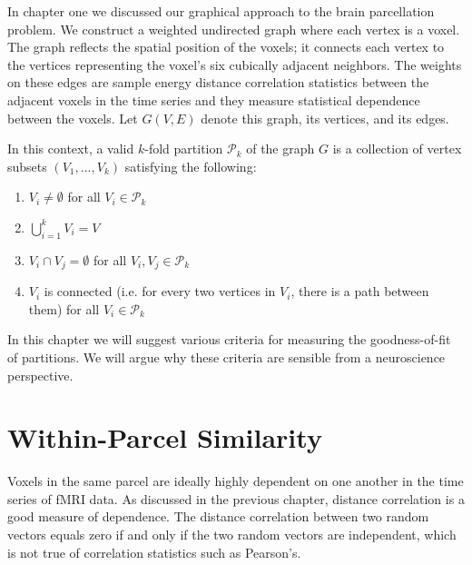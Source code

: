 
In chapter one we discussed our graphical approach to the brain
parcellation problem. We construct a weighted undirected graph where
each vertex is a voxel. The graph reflects the spatial position of the
voxels; it connects each vertex to the vertices representing the voxel's
six cubically adjacent neighbors. The weights on these edges are sample
energy distance correlation statistics between the adjacent voxels in
the time series and they measure statistical dependence between the
voxels. Let $G(V, E)$ denote this graph, its vertices, and its edges.

In this context, a valid $k$-fold partition $\mathcal{P}_k$ of the
graph $G$ is a collection of vertex subsets $(V_1, ..., V_k)$
satisfying the following:

\begin{enumerate}[1.]
\item
$V_i \neq \emptyset$ for all $V_i \in \mathcal{P}_k$

\item
$\bigcup\limits_{i=1}^k V_i = V$

\item
$V_i \cap V_j = \emptyset$ for all $V_i, V_j \in \mathcal{P}_k$

\item
$V_i$ is connected (i.e. for every two vertices in $V_i$, there is a
path between them) for all $V_i \in \mathcal{P}_k$
\end{enumerate}

In this chapter we will suggest various criteria for measuring the
goodness-of-fit of partitions. We will argue why these criteria are
sensible from a neuroscience perspective.

\section{Within-Parcel Similarity}

Voxels in the same parcel are ideally highly dependent on one another in
the time series of fMRI data. As discussed in the previous chapter,
distance correlation is a good measure of dependence. The distance
correlation between two random vectors equals zero if and only if the
two random vectors are independent, which is not true of correlation
statistics such as Pearson's.


